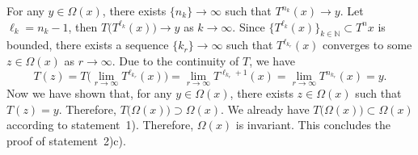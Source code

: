 \documentclass[10pt]{svmult}
\begin{document}
For any $y\in \Omega(x)$, there exists $\{n_k\}\to \infty$ such that $T^{n_k}(x)\to y$. Let $\ell_k = n_k -1$, then $T\big( T^{\ell_k}(x) \big)\to y$ as $k\to \infty$. Since $\{T^{\ell_k}(x)\}_{k\in \mathbb{N}}\subset T^n x$ is bounded, there exists a sequence $\{k_r\}\to \infty$ such that $T^{\ell_{k_r}}(x)$ converges to some $z\in \Omega(x)$ as $r\to \infty$. Due to the continuity of $T$, we have
\begin{equation*}
T(z) = T\Big( \lim_{r\to \infty} T^{\ell_{k_r}}(x) \Big) = \lim_{r\to \infty} T^{\ell_{k_r}+1}(x)=\lim_{r\to \infty}T^{n_{k_r}}(x)=y.
\end{equation*}
Now we have shown that, for any $y\in \Omega(x)$, there exists $z\in \Omega(x)$ such that $T(z)=y$. Therefore, $T\big( \Omega(x) \big)\supset \Omega(x)$. We already have $T\big( \Omega(x) \big)\subset \Omega(x)$ according to statement~1). Therefore, $\Omega(x)$ is invariant. This concludes the proof of statement~2)c).
\end{document}
